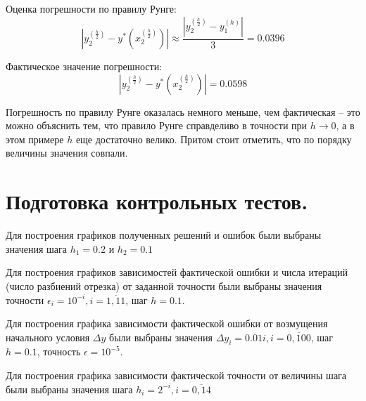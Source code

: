 \documentclass[a4paper, 12pt]{article}
\begin{document}
	Оценка погрешности по правилу Рунге:
	\begin{equation*}
		|y_2^{(\frac{h}{2})}-y^*(x_2^{(\frac{h}{2})})|\approx\frac{|y_2^{(\frac{h}{2})}-y_1^{(h)}|}{3}=0.0396
	\end{equation*}
	
	Фактическое значение погрешности:
	\begin{equation*}
		|y_2^{(\frac{h}{2})}-y^*(x_2^{(\frac{h}{2})})|=0.0598
	\end{equation*}

	Погрешность по правилу Рунге оказалась немного меньше, чем фактическая -- это можно объяснить тем, что правило Рунге справделиво в точности при $h\rightarrow0$, а в этом примере $h$ еще достаточно велико. Притом стоит отметить, что по порядку величины значения совпали.
	
	\section{Подготовка контрольных тестов.}
	
	Для построения графиков полученных решений и ошибок были выбраны значения шага $h_1=0.2$ и $h_2=0.1$
	
	Для построения графиков зависимостей фактической ошибки и числа итераций (число разбиений отрезка) от заданной точности были выбраны значения точности $\epsilon_i=10^{-i}, i=\overline{1,11}$, шаг $h=0.1$. 
	
	Для построения графика зависимости фактической ошибки от возмущения начального условия $\Delta y$ были выбраны значения $\Delta y_i=0.01i, i=\overline{0,100}$, шаг $h=0.1$, точность $\epsilon=10^{-5}$.
	
	Для построения графика зависимости фактической точности от величины шага были выбраны значения шага $h_i=2^{-i}, i=\overline{0,14}$
	
\end{document}
